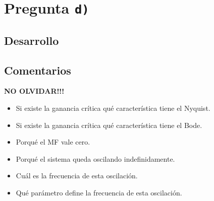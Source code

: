 \section{Pregunta \texttt{d)}}\label{pregunta-d}


\subsection{Desarrollo}


\FloatBarrier
\subsection{Comentarios}

\textbf{NO OLVIDAR!!!}



\begin{itemize}
  \item Si existe la ganancia crítica qué característica tiene el Nyquist.
  \item Si existe la ganancia crítica qué característica tiene el Bode.
  \item Porqué el MF vale cero.
  \item Porqué el sistema queda oscilando indefinidamente.
  \item Cuál es la frecuencia de esta oscilación.
  \item Qué parámetro define la frecuencia de esta oscilación.
\end{itemize}
